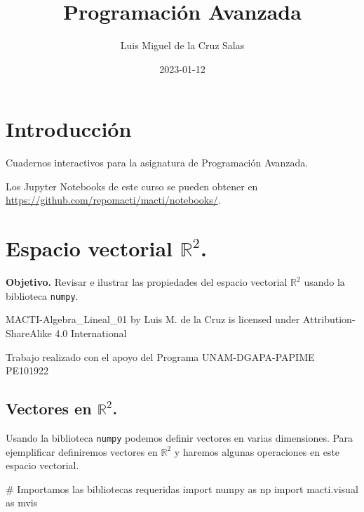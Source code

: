 \documentclass[
  letterpaper,
  DIV=11,
  numbers=noendperiod]{scrreprt}
\title{Programación Avanzada}
\author{Luis Miguel de la Cruz Salas}
\date{2023-01-12}
\newenvironment{Shaded}{\begin{snugshade}}{\end{snugshade}}
\newcommand{\CommentTok}[1]{\textcolor[rgb]{0.37,0.37,0.37}{#1}}
\newcommand{\ImportTok}[1]{\textcolor[rgb]{0.00,0.46,0.62}{#1}}
\newcommand{\NormalTok}[1]{\textcolor[rgb]{0.00,0.23,0.31}{#1}}
\renewcommand*\contentsname{Table of contents}
\newcommand\contentsname{Table of contents}
\begin{document}
\maketitle

\renewcommand*\contentsname{Table of contents}
{
\hypersetup{linkcolor=}
\setcounter{tocdepth}{2}
\tableofcontents
}

\chapter*{Introducción}\label{introducciuxf3n}


Cuadernos interactivos para la asignatura de Programación Avanzada.

Los Jupyter Notebooks de este curso se pueden obtener en
\url{https://github.com/repomacti/macti/notebooks/}.


\chapter{\texorpdfstring{Espacio vectorial
\(\mathbb{R}^2\).}{Espacio vectorial \textbackslash mathbb\{R\}\^{}2.}}\label{espacio-vectorial-mathbbr2.}

\textbf{Objetivo.} Revisar e ilustrar las propiedades del espacio
vectorial \(\mathbb{R}^2\) usando la biblioteca \texttt{numpy}.

MACTI-Algebra\_Lineal\_01 by Luis M. de la Cruz is licensed under
Attribution-ShareAlike 4.0 International

Trabajo realizado con el apoyo del Programa UNAM-DGAPA-PAPIME PE101922

\section{\texorpdfstring{Vectores en
\(\mathbb{R}^2\).}{Vectores en \textbackslash mathbb\{R\}\^{}2.}}\label{vectores-en-mathbbr2.}

Usando la biblioteca \texttt{numpy} podemos definir vectores en varias
dimensiones. Para ejemplificar definiremos vectores en \(\mathbb{R}^2\)
y haremos algunas operaciones en este espacio vectorial.

\begin{Shaded}
\begin{Highlighting}[]
\CommentTok{\# Importamos las bibliotecas requeridas}
\ImportTok{import}\NormalTok{ numpy }\ImportTok{as}\NormalTok{ np}
\ImportTok{import}\NormalTok{ macti.visual }\ImportTok{as}\NormalTok{ mvis}
\end{Highlighting}
\end{Shaded}
\end{document}
